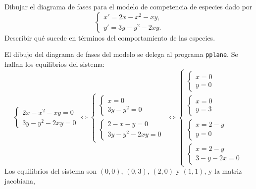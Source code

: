 \documentclass[11pt]{report}
\begin{document}
\begin{exercise}
    Dibujar el diagrama de fases para el modelo de competencia de especies dado por
    \[\begin{cases}
        x'=2x-x^2-xy, \\
        y'=3y-y^2-2xy.
    \end{cases}\]
    Describir qué sucede en términos del comportamiento de las especies.
\end{exercise}

\begin{solution}
    El dibujo del diagrama de fases del modelo se delega al programa \texttt{pplane}. Se hallan los equilibrios del sistema:
    \[\begin{cases}
        2x-x^2-xy = 0 \\
        3y-y^2-2xy = 0
    \end{cases} \iff \begin{cases}
        \begin{cases}
            x = 0 \\
            3y-y^2 = 0
        \end{cases} \\[20pt]
        \begin{cases}
            2-x-y = 0 \\
            3y-y^2-2xy = 0
        \end{cases}
    \end{cases} \iff \begin{cases}
        \begin{cases}
            x = 0 \\
            y = 0
        \end{cases} \\[20pt]
        \begin{cases}
            x = 0 \\
            y = 3
        \end{cases} \\[20pt]
        \begin{cases}
            x = 2-y \\
            y = 0
        \end{cases} \\[20pt]
        \begin{cases}
            x = 2-y \\
            3-y-2x = 0
        \end{cases}
    \end{cases} \]
    Los equilibrios del sistema son $(0,0)$, $(0,3)$, $(2,0)$ y $(1,1)$, y la matriz jacobiana,

\end{solution}
\end{document}
